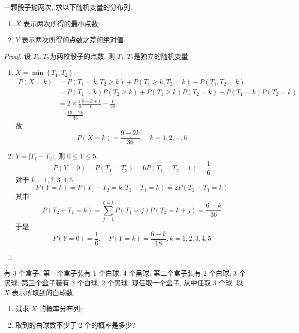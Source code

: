 \documentclass[../main.tex]{subfiles}
\begin{document}
\begin{exercise}{}{}
一颗骰子抛两次, 求以下随机变量的分布列.
\begin{enumerate}
    \item $X$ 表示两次所得的最小点数;
    \item $Y$ 表示两次所得的点数之差的绝对值.
\end{enumerate}
\end{exercise}
\begin{proof}
    设 \(  T_1,T_2  \)为两枚骰子的点数, 则 \(  T_1,T_2  \)是独立的随机变量 
    \begin{enumerate}
        \item  \(  X= \min \left\{ T_1,T_2 \right\}  \).  \[
        \begin{aligned}
        P\left( X= k \right)&= P\left( T_1= k, T_2\ge k \right)+ P\left( T_1\ge k, T_2= k \right)-P\left( T_1,T_2= k \right)    \\ 
         &= P\left( T_1= k \right)P\left( T_2\ge k \right)+ P\left( T_1\ge k \right)P\left( T_2= k \right)-P\left( T_1= k \right)     P\left( T_2= k \right)\\ 
          &= 2\times \frac{1 }{6 }\frac{6-k + 1}{6 }   -\frac{1 }{36 }\\ 
           &= \frac{13-2k }{36 }  
        \end{aligned} 
        \]故 \[
        P\left( X= k \right)= \frac{9-2k }{36 },\quad k= 1,2,\cdots ,6  
        \]
        \item \(  Y= \left| T_1-T_2 \right|   \), 则 \(  0\le Y\le 5  \).  \[
        P\left( Y= 0 \right)= P\left( T_1= T_2 \right)= 6P\left( T_1= T_2= 1 \right)= \frac{1 }{6 }    
        \] 对于 \(  k= 1,2,3,4,5 \), \[
        P\left( Y= k \right)= P\left( T_1-T_2= k, T_2-T_1= k \right)= 2P\left( T_2-T_1= k \right)   
        \]其中 \[
        P\left( T_2-T_1= k \right)= \sum _{j = 1}^{6-k}P\left( T_1= j \right)  P\left( T_2= k+ j \right)= \frac{6-k }{36 }  
        \]于是 \[
       P\left( Y= 0 \right)= \frac{1 }{6 },\quad    P\left( Y= k \right)= \frac{6-k }{18 }   , k = 1,2,3,4,5
        \]
    \end{enumerate}
      
\end{proof}
\begin{exercise}{}{}
    有 3 个盒子, 第一个盒子装有 1 个白球, 4 个黑球; 第二个盒子装有 2 个白球, 3 个黑球; 第三个盒子装有 3 个白球, 2 个黑球. 现任取一个盒子, 从中任取 3 个球. 以 $X$ 表示所取到的白球数.
\begin{enumerate}
\item 试求 $X$ 的概率分布列;
\item 取到的白球数不少于 2 个的概率是多少?
\end{enumerate}
\end{exercise}
\end{document}

